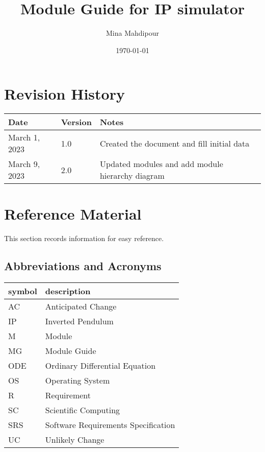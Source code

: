 \documentclass[12pt, titlepage]{article}
\begin{document}
\title{Module Guide for IP simulator} 
\author{Mina Mahdipour}
\date{\today}

\maketitle


\section{Revision History}

\begin{tabularx}{\textwidth}{p{3cm}p{2cm}X}
\toprule {\bf Date} & {\bf Version} & {\bf Notes}\\
\midrule
March 1, 2023 & 1.0 & Created the document and fill initial data\\
March 9, 2023 & 2.0 & Updated modules and add module hierarchy diagram\\
\bottomrule
\end{tabularx}

\newpage

\section{Reference Material}

This section records information for easy reference.

\subsection{Abbreviations and Acronyms}

\renewcommand{\arraystretch}{1.2}
\begin{tabular}{l l} 
  \toprule		
  \textbf{symbol} & \textbf{description}\\
  \midrule 
  AC & Anticipated Change\\
  IP & Inverted Pendulum\\
  M & Module \\
  MG & Module Guide \\
  ODE & Ordinary Differential Equation\\
  OS & Operating System \\
  R & Requirement\\
  SC & Scientific Computing \\
  SRS & Software Requirements Specification\\
  UC & Unlikely Change \\

  \bottomrule
\end{tabular}\\
\end{document}
